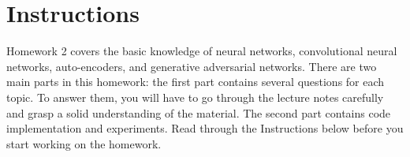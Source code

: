 \section*{Instructions}

\begin{notebox}
Homework 2 covers the basic knowledge of neural networks, convolutional neural networks, auto-encoders, and generative adversarial networks. There are two main parts in this homework: the first part contains several questions for each topic. To answer them, you will have to go through the lecture notes carefully and grasp a solid understanding of the material. The second part contains code implementation and experiments. Read through the Instructions below before you start working on the homework.
\end{notebox}

